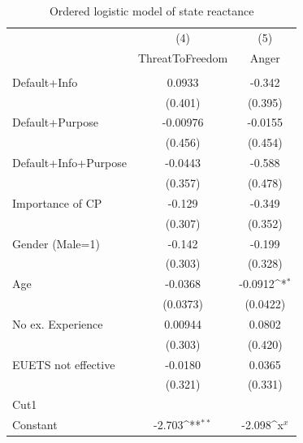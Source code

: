 \documentclass[review, authoryear,12pt]{elsarticle}
\begin{document}
\begin{table}[htbp]\centering
\begin{adjustbox}{max width=\textwidth}
\def\sym#1{\ifmmode^{#1}\else\(^{#1}\)\fi}
\caption{Ordered logistic model of state reactance\label{tab5}}
\begin{tabular}{l*{2}{c}}
\hline\hline
                    &\multicolumn{1}{c}{(4)}&\multicolumn{1}{c}{(5)}\\
                    &\multicolumn{1}{c}{ThreatToFreedom}&\multicolumn{1}{c}{Anger}\\
\hline
                &                     &                     \\
Default+Info        &      0.0933         &      -0.342         \\
                    &     (0.401)         &     (0.395)         \\
Default+Purpose     &    -0.00976         &     -0.0155         \\
                    &     (0.456)         &     (0.454)         \\
Default+Info+Purpose&     -0.0443         &      -0.588         \\
                    &     (0.357)         &     (0.478)         \\
Importance of CP       &      -0.129         &      -0.349         \\
                    &     (0.307)         &     (0.352)         \\
Gender (Male=1)                &      -0.142         &      -0.199         \\
                    &     (0.303)         &     (0.328)         \\
Age                 &     -0.0368         &     -0.0912\sym{*}  \\
                    &    (0.0373)         &    (0.0422)         \\
No ex. Experience        &     0.00944         &      0.0802         \\
                    &     (0.303)         &     (0.420)         \\
EUETS not effective &     -0.0180         &      0.0365         \\
                    &     (0.321)         &     (0.331)         \\
\hline
Cut1                &                     &                     \\
Constant            &      -2.703\sym{**} &      -2.098\sym{x}  \\

\end{tabular}
\end{adjustbox}
\end{table}
\end{document}
